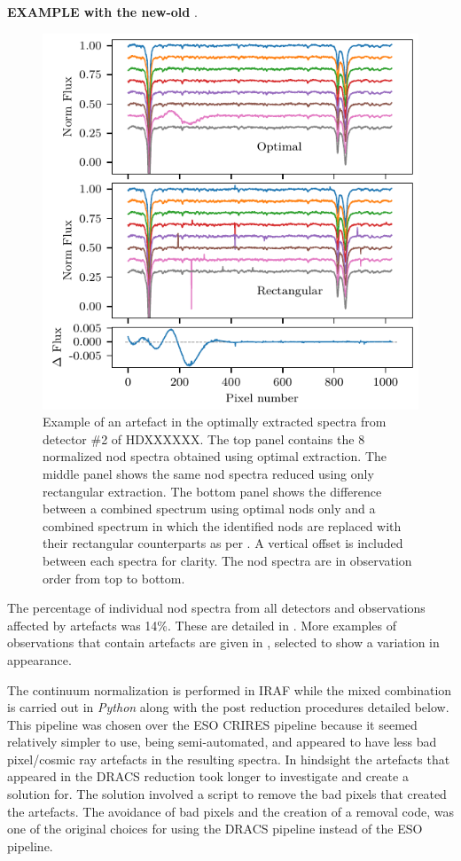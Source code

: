 \textbf{
EXAMPLE with the new-old }.
\begin{figure}
    \centering
    \includegraphics[width=\hsize/2]{figures/reduction/bp_plots/Bad_pixel_replacement}
    \caption{Example of an artefact in the optimally extracted spectra from detector \#2 of {\red{} HDXXXXXX}. The top panel contains the 8 normalized nod spectra obtained using optimal extraction. The middle panel shows the same nod spectra reduced using only rectangular extraction. The bottom panel shows the difference between a combined spectrum using optimal nods only and a combined spectrum in which the identified nods are replaced with their rectangular counterparts as per . A vertical offset is included between each spectra for clarity. The nod spectra are in observation order from top to bottom.}
    \label{fig:badpixelreplacement}
\end{figure}

The percentage of individual nod spectra from all detectors and observations affected by artefacts was 14\%. These are detailed in . More examples of observations that contain artefacts are given in , selected to show a variation in appearance.


The continuum normalization is performed in {IRAF} while the mixed combination is carried out in \emph{Python} along with the post reduction procedures detailed below. This pipeline was chosen over the {ESO} {CRIRES} pipeline because it seemed relatively simpler to use, being semi-automated, and appeared to have less bad pixel/cosmic ray artefacts in the resulting spectra. In hindsight the artefacts that appeared in the {DRACS} reduction took longer to investigate and create a solution for. The solution involved a script to remove the bad pixels that created the artefacts. The avoidance of bad pixels and the creation of a removal code, was one of the original choices for using the {DRACS} pipeline instead of the {ESO} pipeline.


